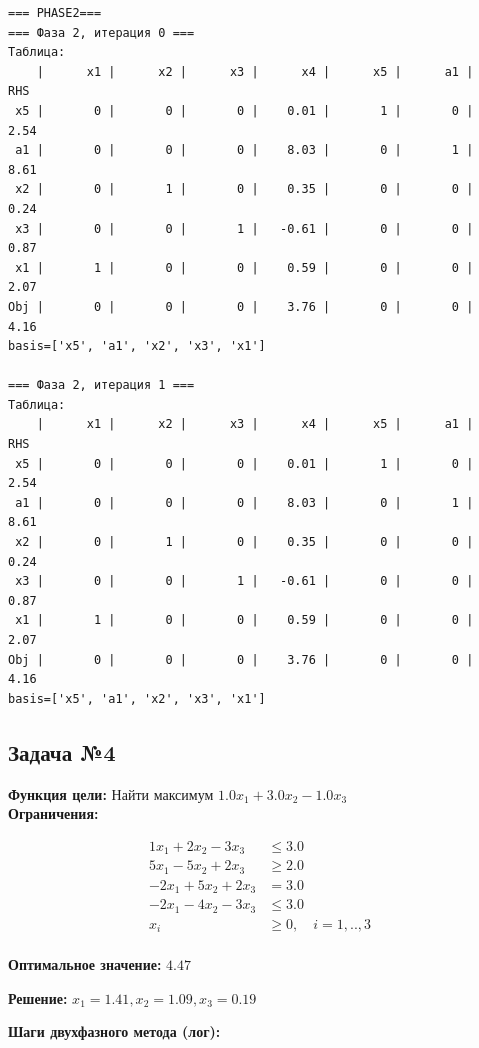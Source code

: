 \documentclass[a4paper,12pt]{article}
\begin{document}
\begin{verbatim}
=== PHASE2===
=== Фаза 2, итерация 0 ===
Таблица:
    |      x1 |      x2 |      x3 |      x4 |      x5 |      a1 |     RHS
 x5 |       0 |       0 |       0 |    0.01 |       1 |       0 |    2.54
 a1 |       0 |       0 |       0 |    8.03 |       0 |       1 |    8.61
 x2 |       0 |       1 |       0 |    0.35 |       0 |       0 |    0.24
 x3 |       0 |       0 |       1 |   -0.61 |       0 |       0 |    0.87
 x1 |       1 |       0 |       0 |    0.59 |       0 |       0 |    2.07
Obj |       0 |       0 |       0 |    3.76 |       0 |       0 |    4.16
basis=['x5', 'a1', 'x2', 'x3', 'x1']

=== Фаза 2, итерация 1 ===
Таблица:
    |      x1 |      x2 |      x3 |      x4 |      x5 |      a1 |     RHS
 x5 |       0 |       0 |       0 |    0.01 |       1 |       0 |    2.54
 a1 |       0 |       0 |       0 |    8.03 |       0 |       1 |    8.61
 x2 |       0 |       1 |       0 |    0.35 |       0 |       0 |    0.24
 x3 |       0 |       0 |       1 |   -0.61 |       0 |       0 |    0.87
 x1 |       1 |       0 |       0 |    0.59 |       0 |       0 |    2.07
Obj |       0 |       0 |       0 |    3.76 |       0 |       0 |    4.16
basis=['x5', 'a1', 'x2', 'x3', 'x1']

\end{verbatim}



\subsection*{Задача №4}
\textbf{Функция цели: }
Найти максимум $ 1.0x_{1} +3.0x_{2} -1.0x_{3} $\\

\textbf{Ограничения:}

\[ \begin{aligned}
1x_{1} +2x_{2} -3x_{3} &\le 3.0 \\
5x_{1} -5x_{2} +2x_{3} &\ge 2.0 \\
-2x_{1} +5x_{2} +2x_{3} &= 3.0 \\
-2x_{1} -4x_{2} -3x_{3} &\le 3.0 \\
x_i &\ge 0,\quad i=1,..,3\\
\end{aligned}\]

\textbf{Оптимальное значение: }$4.47$

\textbf{Решение: }$x_{1}=1.41, x_{2}=1.09, x_{3}=0.19$

\textbf{Шаги двухфазного метода (лог):}
\end{document}
